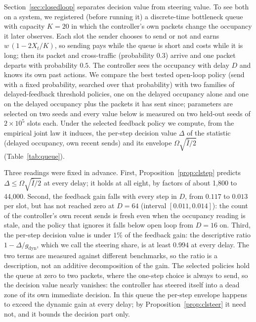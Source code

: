 \documentclass[11pt]{article}
\begin{document}
Section~\ref{sec:closedloop} separates decision value from steering value. To see
both on a system, we registered (before running it) a discrete-time
bottleneck queue with capacity $K=20$ in which the controller's own
packets change the occupancy it later observes. Each slot the sender
chooses to send or not and earns $w\,(1-2X_t/K)$, so sending pays while the
queue is short and costs while it is long; then its packet and
cross-traffic (probability $0.3$) arrive and one packet departs with
probability $0.5$. The controller sees the occupancy with delay $D$ and
knows its own past actions. We compare the best tested open-loop policy
(send with a fixed probability, searched over that probability) with two
families of delayed-feedback threshold policies,
one on the delayed occupancy alone and one on the delayed occupancy plus
the packets it has sent since; parameters are selected on two seeds and
every value below is measured on two held-out seeds of $2\times10^5$ slots
each. Under the selected feedback policy we compute, from the empirical
joint law it induces, the per-step decision value $\Delta$ of the statistic
(delayed occupancy, own recent sends) and its envelope
$\Omega\sqrt{\hat I/2}$ (Table~\ref{tab:queue}).

Three readings were fixed in advance. First, Proposition~\ref{prop:clstep}
predicts $\Delta\le\Omega\sqrt{\hat I/2}$ at every delay; it holds at all
eight, by factors of about 1{,}800 to 44{,}000. Second, the feedback gain
falls with every step in $D$, from $0.117$ to $0.013$ per slot, but has not
reached zero at $D=64$ (interval $[0.011,0.014]$): the count of the
controller's own recent sends is fresh even when the occupancy reading is
stale, and the policy that ignores it falls below open loop from $D=16$
on. Third, the per-step decision value is under $1\%$ of the feedback
gain: the descriptive ratio $1-\Delta/g_{\mathrm{dyn}}$, which we call the
steering share, is at least $0.994$ at every delay. The two terms are
measured against different benchmarks, so the ratio is a description,
not an additive decomposition of the gain.
The selected policies hold the queue at zero to two packets, where the
one-step choice is always to send, so the decision value nearly
vanishes: the controller has steered itself into a dead zone of its own
immediate decision. In this queue the per-step envelope happens to exceed
the dynamic gain at every delay; by Proposition~\ref{prop:clsteer} it need not,
and it bounds the decision part only.
\end{document}
